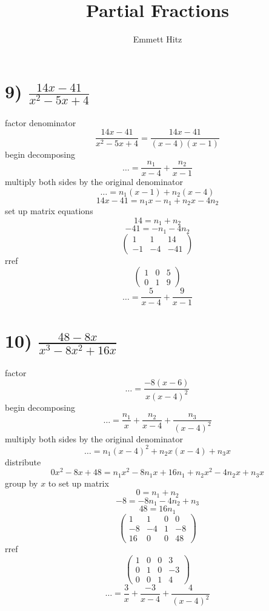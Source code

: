 \documentclass[12pt]{article}
\author{Emmett Hitz}
\title{Partial Fractions}
\begin{document}
\maketitle
  \section*{9) $\frac{14x-41}{x^2-5x+4}$}
  factor denominator
  $$\frac{14x-41}{x^2-5x+4}=\frac{14x-41}{(x-4)(x-1)}$$
  begin decomposing
  $$\ldots = \frac{n_1}{x-4}+\frac{n_2}{x-1}$$
  multiply both sides by the original denominator
  $$\ldots = n_1(x-1)+n_2(x-4)$$
  $$14x-41=n_1x-n_1+n_2x-4n_2$$
  set up matrix equations
  $$14=n_1+n_2$$
  $$-41=-n_1-4n_2$$
  $$
  \left(
    \begin{array}{cc|c}
      1 & 1 & 14 \\ 
      -1 & -4 & -41 
    \end{array}
  \right)
  $$
  rref
  $$
  \left(
    \begin{array}{cc|c}
      1 & 0 & 5 \\ 
      0 & 1 & 9 
    \end{array}
  \right)
  $$
  $$\ldots = \frac{5}{x-4}+\frac{9}{x-1}$$
  \section*{10) $\frac{48-8x}{x^3-8x^2+16x}$}
  factor
  $$\ldots=\frac{-8(x-6)}{x(x-4)^2}$$
  begin decomposing
  $$\ldots=\frac{n_1}{x}+\frac{n_2}{x-4}+\frac{n_3}{(x-4)^2}$$
  multiply both sides by the original denominator
  $$\ldots=n_1(x-4)^2+n_2x(x-4)+n_3x$$
  distribute
  $$0x^2-8x+48=n_1x^2-8n_1x+16n_1+n_2x^2-4n_2x+n_3x$$
  group by $x$ to set up matrix
  $$0=n_1+n_2$$
  $$-8=-8n_1-4n_2+n_3$$
  $$48=16n_1$$
  $$
  \left(
    \begin{array}{ccc|c}
      1 & 1 & 0 & 0 \\ 
      -8 & -4 & 1 & -8 \\ 
      16 & 0 & 0 & 48 
    \end{array}
  \right)
  $$
  rref
  $$
  \left(
    \begin{array}{ccc|c}
      1 & 0 & 0 & 3 \\ 
      0 & 1 & 0 & -3 \\ 
      0 & 0 & 1 & 4 
    \end{array}
  \right)
  $$
  $$\ldots=\frac{3}{x}+\frac{-3}{x-4}+\frac{4}{(x-4)^2}$$ \newpage
\end{document}
